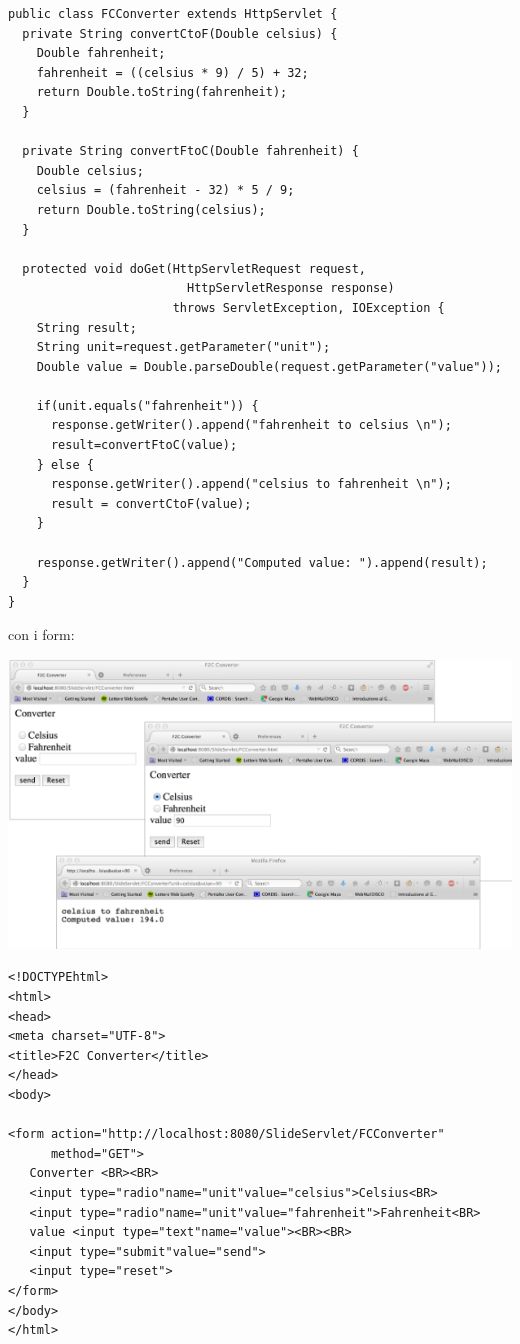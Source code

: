 \message{ !name(sd.tex)}\documentclass[a4paper,12pt, oneside]{book}
\begin{document}
\begin{verbatim}
public class FCConverter extends HttpServlet {
  private String convertCtoF(Double celsius) {
    Double fahrenheit;
    fahrenheit = ((celsius * 9) / 5) + 32;
    return Double.toString(fahrenheit);
  }
  
  private String convertFtoC(Double fahrenheit) {    
    Double celsius;
    celsius = (fahrenheit - 32) * 5 / 9;
    return Double.toString(celsius);
  }
  
  protected void doGet(HttpServletRequest request,
                         HttpServletResponse response) 
                       throws ServletException, IOException {
    String result;     
    String unit=request.getParameter("unit");
    Double value = Double.parseDouble(request.getParameter("value"));
    
    if(unit.equals("fahrenheit")) {
      response.getWriter().append("fahrenheit to celsius \n");
      result=convertFtoC(value);
    } else {
      response.getWriter().append("celsius to fahrenheit \n");
      result = convertCtoF(value);
    }
    
    response.getWriter().append("Computed value: ").append(result);
  }
}   
\end{verbatim}
con i form:
\begin{center}
	\includegraphics[scale=0.8]{img/cel3.png}
\end{center}
\begin{verbatim}
<!DOCTYPEhtml> 
<html> 
<head>
<meta charset="UTF-8">
<title>F2C Converter</title>
</head>
<body>

<form action="http://localhost:8080/SlideServlet/FCConverter"
      method="GET">
   Converter <BR><BR>
   <input type="radio"name="unit"value="celsius">Celsius<BR>
   <input type="radio"name="unit"value="fahrenheit">Fahrenheit<BR>
   value <input type="text"name="value"><BR><BR>
   <input type="submit"value="send">
   <input type="reset">
</form>
</body>
</html>
\end{verbatim}
\end{document}
